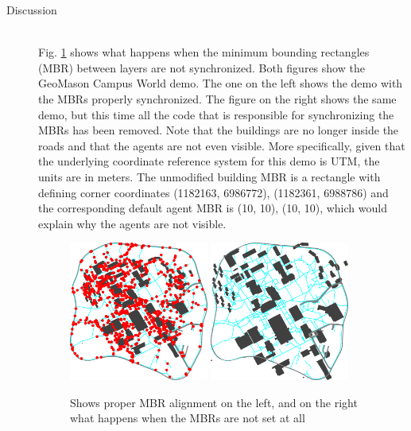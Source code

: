 \documentclass[twoside,10pt]{book}
\begin{document}
\begin{description}
\item[Discussion]~\\
Fig. \ref{fig:colorworldMBR} shows what happens when the minimum
bounding rectangles (MBR) between layers are not synchronized. Both figures
show the GeoMason Campus World demo.  The one on the left shows the
demo with the MBRs properly synchronized.  The figure on the right
shows the same demo, but this time all the code that is responsible
for synchronizing the MBRs has been removed.  Note that the buildings
are no longer inside the roads and that the agents are not even
visible. More specifically, given that the underlying coordinate reference system for
this demo is UTM, the units are in meters.  The unmodified building MBR is a
rectangle with defining corner coordinates (1182163, 6986772),
(1182361, 6988786) and the corresponding default agent MBR is (10,
10), (10, 10), which would explain why the agents are not visible.
\begin{figure}[ht]
  \centering
  \includegraphics[width=0.45\textwidth]{campusworldnormal.pdf}
  \includegraphics[width=0.45\textwidth]{campusworldbroken.pdf}
  \caption{Shows proper MBR
    alignment on the left, and on the right what happens when the MBRs are not set
    at all}
  \label{fig:colorworldMBR}
\end{figure}

\end{description}
\end{document}
